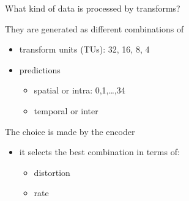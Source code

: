 \documentclass[10pt]{beamer} %
\begin{document}
\begin{frame}{What kind of data is processed by transforms?}
\begin{minipage}{0.58\textwidth}
\begin{block}{They are generated as different combinations of}
\begin{itemize}
				\item transform units (TUs): 32, 16, 8, 4
				\item predictions
					\begin{itemize}
						\item spatial or intra: 0,1,\ldots,34
						\item temporal or inter
					\end{itemize}
			\end{itemize}
		\end{block}
		\begin{block}{The choice is made by the encoder}
			\begin{itemize}
				\item it selects the best combination in terms of:
					\begin{itemize}
						\item distortion
						\item rate
					\end{itemize}
			\end{itemize}
		\end{block}
	\end{minipage}
\end{frame}
\end{document}
